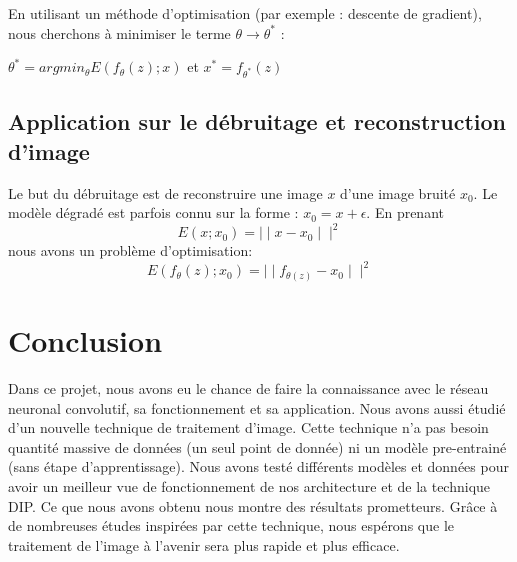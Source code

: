 \documentclass[
  12pt,
  dvipsnames]{article}
\begin{document}
En utilisant un méthode d'optimisation (par exemple : descente de gradient), nous cherchons à minimiser le terme \(\theta \rightarrow \theta^*\) :

\begin {center} $\theta ^* = argmin_{\theta} E(f_{\theta}(z);x)$ et $x^* = f_{\theta^*}(z)$ \end {center}

\hypertarget{application-sur-le-duxe9bruitage-et-reconstruction-dimage}{%
\subsection{Application sur le débruitage et reconstruction d'image}\label{application-sur-le-duxe9bruitage-et-reconstruction-dimage}}

Le but du débruitage est de reconstruire une image \(x\) d'une image bruité \(x_0\). Le modèle dégradé est parfois connu sur la forme : \(x_0 = x + \epsilon\). En prenant \[ E(x;x_{0})= \mid\mid x - x_{0} \mid\mid^2 \] nous avons un problème d'optimisation: \[ E(f_{\theta}(z);x_{0})= \mid\mid f_{\theta(z)} - x_{0} \mid\mid^2 \]

\newpage

\hypertarget{conclusion}{%
\section{Conclusion}\label{conclusion}}

Dans ce projet, nous avons eu le chance de faire la connaissance avec le réseau neuronal convolutif, sa fonctionnement et sa application. Nous avons aussi étudié d'un nouvelle technique de traitement d'image. Cette technique n'a pas besoin quantité massive de données (un seul point de donnée) ni un modèle pre-entrainé (sans étape d'apprentissage). Nous avons testé différents modèles et données pour avoir un meilleur vue de fonctionnement de nos architecture et de la technique DIP. Ce que nous avons obtenu nous montre des résultats prometteurs. Grâce à de nombreuses études inspirées par cette technique, nous espérons que le traitement de l'image à l'avenir sera plus rapide et plus efficace.

\newpage

\printbibliography
\end{document}
